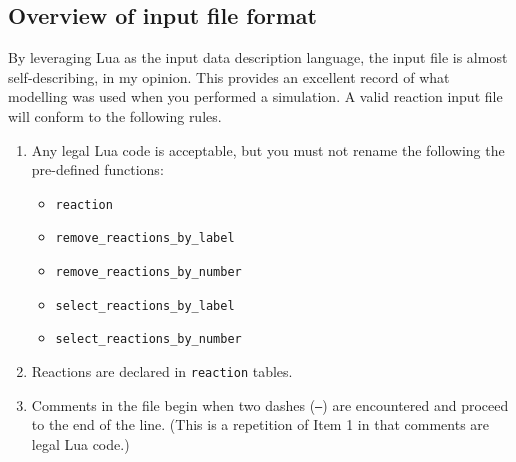 \subsection{Overview of input file format}
By leveraging Lua as the input data description language,
the input file is almost self-describing, in my opinion.
This provides an excellent record of what modelling was used when
you performed a simulation.
A valid reaction input file will conform to the following rules.
\begin{enumerate}
 \item Any legal Lua code is acceptable, but you must not
       rename the following the pre-defined functions:
       \begin{itemize}
        \item \texttt{reaction}
        \item \texttt{remove\_reactions\_by\_label}
        \item \texttt{remove\_reactions\_by\_number}
        \item \texttt{select\_reactions\_by\_label}
        \item \texttt{select\_reactions\_by\_number}
       \end{itemize}
 \item Reactions are declared in \texttt{reaction} tables.
 \item Comments in the file begin when two dashes (\texttt{--}) are encountered
       and proceed to the end of the line. (This is a repetition of Item 1 in that
       comments are legal Lua code.)
\end{enumerate}

